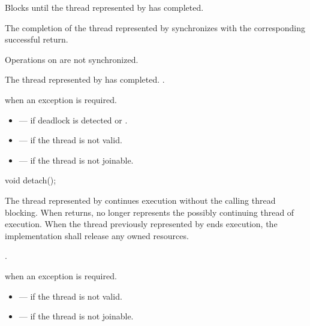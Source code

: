 \begin{itemdescr}
\pnum
\effects Blocks until the thread represented by  has completed.

\pnum
\sync The completion of the thread represented by 
synchronizes with
the corresponding successful  return.
\begin{note} Operations on  are not synchronized. \end{note}

\pnum
\ensures The thread represented by  has completed.
.

\pnum
\throws
{} when an exception is required.

\pnum
\errors
\begin{itemize}
\item {} --- if deadlock is detected or
.

\item {} --- if the thread is not valid.

\item {} --- if the thread is not joinable.
\end{itemize}
\end{itemdescr}

%
\begin{itemdecl}
void detach();
\end{itemdecl}

\begin{itemdescr}
\pnum
\effects
The thread represented by  continues execution
without the calling thread blocking.
When  returns,
 no longer represents the possibly continuing thread of execution.
When the thread previously represented by  ends execution,
the implementation shall release any owned resources.

\pnum
\ensures {}.

\pnum
\throws
{} when an exception is required.

\pnum \errors
\begin{itemize}
\item {} --- if the thread is not valid.
\item {} --- if the thread is not joinable.
\end{itemize}
\end{itemdescr}

